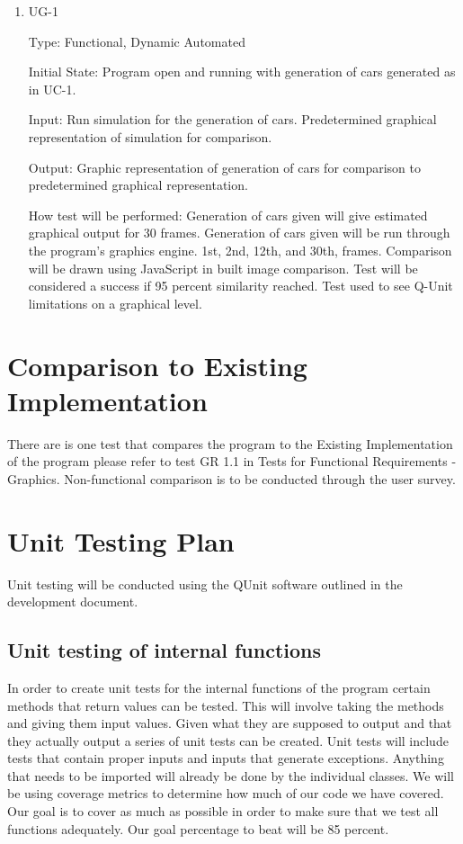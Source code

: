 \documentclass[12pt, titlepage]{article}
\begin{document}
\begin{enumerate}

\item{UG-1\\}

Type: Functional, Dynamic Automated
					
Initial State: Program open and running with generation of cars generated as in 
UC-1.
					
Input: Run simulation for the generation of cars. Predetermined graphical 
representation of simulation for comparison.
					
Output: Graphic representation of generation of cars for comparison to 
predetermined graphical representation.
					
How test will be performed: Generation of cars given will give estimated 
graphical output for 30 frames. Generation of cars given will be run through the 
program's graphics engine. 1st, 2nd, 12th, and 30th, frames. Comparison will be 
drawn using JavaScript in built image comparison. Test will be considered a 
success if 95 percent similarity reached. Test used to see Q-Unit limitations on 
a graphical level.

\end{enumerate}
	
\section{Comparison to Existing Implementation}	
There are is one test that compares the program to the Existing Implementation 
of the program please refer to test GR 1.1 in Tests for Functional Requirements 
- Graphics. Non-functional comparison is to be conducted through the user 
survey.
				
\section{Unit Testing Plan}

Unit testing will be conducted using the QUnit software outlined in the 
development document.
		
\subsection{Unit testing of internal functions}

In order to create unit tests for the internal functions of the program certain 
methods that return values
can be tested. This will involve taking the methods and giving them input 
values. Given what they are
supposed to output and that they actually output a series of unit tests can be 
created. Unit tests will include
tests that contain proper inputs and inputs that generate exceptions.  Anything 
that needs to be imported will already be done
by the individual classes. We will be using coverage metrics to determine how 
much of our code we have
covered. Our goal is to cover as much as possible in order to make sure that we 
test all functions adequately.
Our goal percentage to beat will be 85 percent.
		
\end{document}
